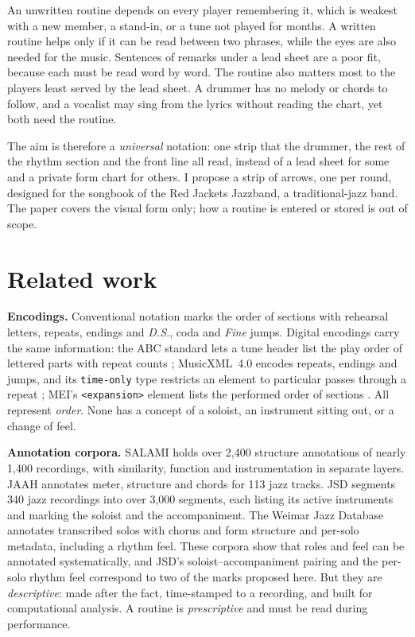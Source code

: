 \documentclass[10pt,twocolumn,a4paper]{article}
\begin{document}
An unwritten routine depends on every player remembering it, which is weakest with a
new member, a stand-in, or a tune not played for months. A written routine helps only
if it can be read between two phrases, while the eyes are also needed for the music.
Sentences of remarks under a lead sheet are a poor fit, because each must be read
word by word. The routine also matters most to the players least served by the lead
sheet. A drummer has no melody or chords to follow, and a vocalist may sing from the
lyrics without reading the chart, yet both need the routine.

The aim is therefore a \emph{universal} notation: one strip that the drummer, the rest
of the rhythm section and the front line all read, instead of a lead sheet for some
and a private form chart for others. I propose a strip of arrows, one per round,
designed for the songbook of the Red Jackets Jazzband, a traditional-jazz band. The
paper covers the visual form only; how a routine is entered or stored is out of scope.

\section{Related work}\label{sec:related}

\textbf{Encodings.} Conventional notation marks the order of sections with rehearsal
letters, repeats, endings and \emph{D.S.}, coda and \emph{Fine} jumps. Digital
encodings carry the same information: the ABC standard lets a tune header list the
play order of lettered parts with repeat counts \citep{walshaw2011}; MusicXML~4.0
encodes repeats, endings and jumps, and its \texttt{time-only} type restricts an
element to particular passes through a repeat \citep{musicxml2021}; MEI's
\texttt{<expansion>} element lists the performed order of sections
\citep{mei}. All represent \emph{order}. None has a concept of a soloist, an
instrument sitting out, or a change of feel.

\textbf{Annotation corpora.} SALAMI \citep{smith2011} holds over 2,400 structure
annotations of nearly 1,400 recordings, with similarity, function and instrumentation
in separate layers. JAAH \citep{eremenko2018} annotates meter, structure and chords
for 113 jazz tracks. JSD \citep{balke2022} segments 340 jazz recordings into over
3,000 segments, each listing its active instruments and marking the soloist and the
accompaniment. The Weimar Jazz Database \citep{pfleiderer2017} annotates transcribed
solos with chorus and form structure and per-solo metadata, including a rhythm feel.
These corpora show that roles and feel can be annotated systematically, and JSD's
soloist--accompaniment pairing and the per-solo rhythm feel correspond to two of the
marks proposed here. But they are \emph{descriptive}: made after the fact,
time-stamped to a recording, and built for computational analysis. A routine is
\emph{prescriptive} and must be read during performance.
\end{document}
